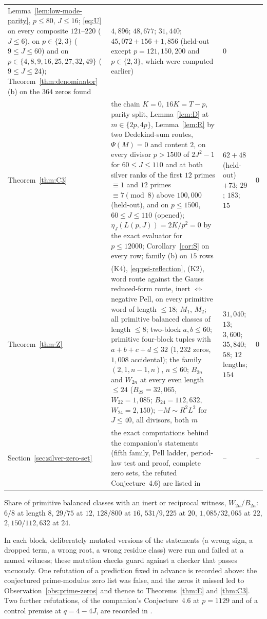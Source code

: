 \documentclass[11pt]{article}
\theoremstyle{definition}
\begin{document}
\begin{small}
\begin{longtable}{@{}L{0.24\textwidth}L{0.41\textwidth}L{0.2\textwidth}L{0.07\textwidth}@{}}
Lemma~\ref{lem:low-mode-parity}, $p\leq80$, $J\leq16$; \eqref{eq:U} on
every composite $121$--$220$ ($J\leq6$), on $p\in\{2,3\}$
($9\leq J\leq60$) and on $p\in\{4,8,9,16,25,27,32,49\}$ ($9\leq J\leq24$);
Theorem~\ref{thm:denominator}(b) on the $364$ zeros found & $4{,}896$;
$48{,}677$; $31{,}440$; $45{,}072+156+1{,}856$ (held-out except $p=121,150,200$
and $p\in\{2,3\}$, which were computed earlier) & $0$\\
Theorem~\ref{thm:C3} & the chain $K=0$, $16K=T-p$, parity split,
Lemma~\ref{lem:D} at $m\in\{2p,4p\}$, Lemma~\ref{lem:R} by two
Dedekind-sum routes, $\Psi(M)=0$ and content $2$, on every divisor
$p>1500$ of $2J^2-1$ for $60\leq J\leq110$ and at both silver ranks of the
first $12$ primes $\equiv1$ and $12$ primes $\equiv7\pmod8$ above
$100{,}000$ (held-out), and on $p\leq1500$, $60\leq J\leq110$ (opened);
$\eta_J(L(p,J))=2K/p^2=0$ by the exact evaluator for $p\leq12000$;
Corollary~\ref{cor:S} on every row; family (b) on $15$ rows &
$62+48$ (held-out) $+73$; $29$; $183$; $15$ & $0$\\
Theorem~\ref{thm:Z} & (K4), \eqref{eq:psi-reflection}, (K2), word route
against the Gauss reduced-form route, inert $\iff$ negative Pell, on every
primitive word of length $\leq18$; $M_1$, $M_2$; all primitive balanced
classes of length $\leq8$; two-block $a,b\leq60$; primitive four-block
tuples with $a+b+c+d\leq32$ ($1{,}232$ zeros, $1{,}008$ accidental);
the family $(2,1,n-1,n)$, $n\leq60$; $B_{2n}$ and $W_{2n}$ at every even
length $\leq24$ ($B_{22}=32{,}065$, $W_{22}=1{,}085$; $B_{24}=112{,}632$,
$W_{24}=2{,}150$); $-M\sim R^2L^2$ for $J\leq40$, all divisors, both $m$ &
$31{,}040$; $13$; $3{,}600$; $35{,}840$; $58$; $12$ lengths; $154$ & $0$\\
Section~\ref{sec:silver-zero-set} & the exact computations behind the
companion's statements (fifth family, Pell ladder, period-law test and
proof, complete zero sets, the refuted Conjecture~4.6) are listed in
\cite[App.~A]{SilverRankZeros2026} & -- & --\\
\bottomrule
\end{longtable}
\end{small}

Share of primitive balanced classes with an inert or reciprocal witness,
$W_{2n}/B_{2n}$: $6/8$ at length $8$, $29/75$ at $12$, $128/800$ at $16$,
$531/9{,}225$ at $20$, $1{,}085/32{,}065$ at $22$, $2{,}150/112{,}632$ at $24$.

In each block, deliberately mutated versions of the statements (a wrong
sign, a dropped term, a wrong root, a wrong residue class) were run and
failed at a named witness; these mutation checks guard against a checker
that passes vacuously.  One refutation of a prediction fixed in advance
is recorded above: the conjectured prime-modulus zero list was false,
and the zeros it missed led to Observation~\ref{obs:prime-zeros} and
thence to Theorems~\ref{thm:E} and \ref{thm:C3}.  Two further
refutations, of the companion's Conjecture~4.6 at $p=1129$ and of a control premise at
$q=4-4J$, are recorded in \cite[App.~A]{SilverRankZeros2026}.
\end{document}
